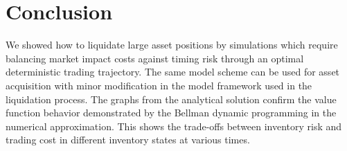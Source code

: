 \section*{Conclusion}
We showed how to liquidate large asset positions by simulations which require balancing market impact costs against timing risk through an optimal deterministic trading trajectory. The same model scheme can be used for asset acquisition with minor modification in the model framework used in the liquidation process. The graphs from the analytical solution confirm the value function behavior demonstrated by the Bellman dynamic programming in the numerical approximation. This shows the trade-offs between inventory risk and trading cost in different inventory states at various times.